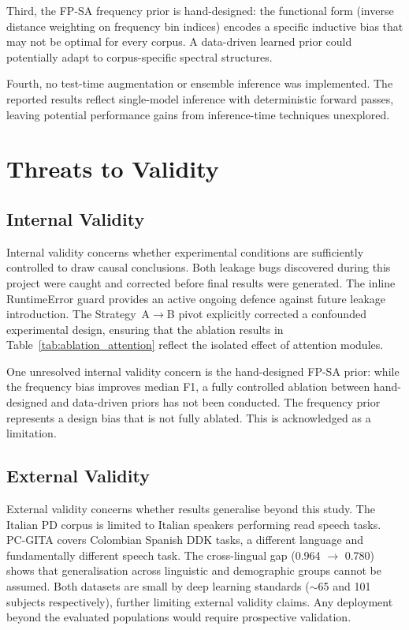 \documentclass[oneside,openany]{final_report}
\begin{document}
Third, the FP-SA frequency prior is hand-designed: the functional form (inverse distance weighting on frequency bin indices) encodes a specific inductive bias that may not be optimal for every corpus. A data-driven learned prior could potentially adapt to corpus-specific spectral structures.

Fourth, no test-time augmentation or ensemble inference was implemented. The reported results reflect single-model inference with deterministic forward passes, leaving potential performance gains from inference-time techniques unexplored.

\section{Threats to Validity}
\label{sec:validity}

\subsection{Internal Validity}

Internal validity concerns whether experimental conditions are sufficiently controlled to draw causal conclusions. Both leakage bugs discovered during this project were caught and corrected before final results were generated. The inline RuntimeError guard provides an active ongoing defence against future leakage introduction. The Strategy~A$\to$B pivot explicitly corrected a confounded experimental design, ensuring that the ablation results in Table~\ref{tab:ablation_attention} reflect the isolated effect of attention modules.

One unresolved internal validity concern is the hand-designed FP-SA prior: while the frequency bias improves median F1, a fully controlled ablation between hand-designed and data-driven priors has not been conducted. The frequency prior represents a design bias that is not fully ablated. This is acknowledged as a limitation.

\subsection{External Validity}

External validity concerns whether results generalise beyond this study. The Italian PD corpus is limited to Italian speakers performing read speech tasks. PC-GITA covers Colombian Spanish DDK tasks, a different language and fundamentally different speech task. The cross-lingual gap (0.964 $\to$ 0.780) shows that generalisation across linguistic and demographic groups cannot be assumed. Both datasets are small by deep learning standards ($\sim$65 and 101 subjects respectively), further limiting external validity claims. Any deployment beyond the evaluated populations would require prospective validation.
\end{document}
